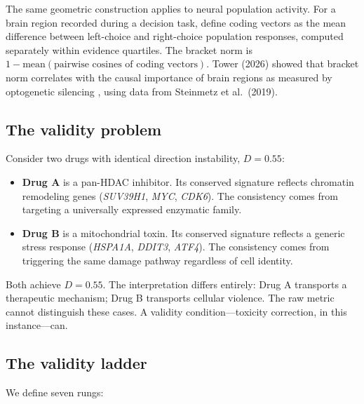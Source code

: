 \documentclass{article}
\begin{document}
The same geometric construction applies to neural population activity. For a
brain region recorded during a decision task, define coding vectors as the
mean difference between left-choice and right-choice population responses,
computed separately within evidence quartiles. The bracket norm is
$1 - \text{mean}(\text{pairwise cosines of coding vectors})$. Tower (2026)
showed that bracket norm correlates with the causal importance of brain
regions as measured by optogenetic silencing \citep{zatka2021direction}, using
data from Steinmetz et al.\ (2019).

\subsection{The validity problem}

Consider two drugs with identical direction instability, $D = 0.55$:

\begin{itemize}
  \item \textbf{Drug A} is a pan-HDAC inhibitor. Its conserved signature
    reflects chromatin remodeling genes (\emph{SUV39H1}, \emph{MYC},
    \emph{CDK6}). The consistency comes from targeting a universally
    expressed enzymatic family.
  \item \textbf{Drug B} is a mitochondrial toxin. Its conserved signature
    reflects a generic stress response (\emph{HSPA1A}, \emph{DDIT3},
    \emph{ATF4}). The consistency comes from triggering the same damage
    pathway regardless of cell identity.
\end{itemize}

Both achieve $D = 0.55$. The interpretation differs entirely: Drug A
transports a therapeutic mechanism; Drug B transports cellular violence. The
raw metric cannot distinguish these cases. A validity condition---toxicity
correction, in this instance---can.

\subsection{The validity ladder}

We define seven rungs:
\end{document}
